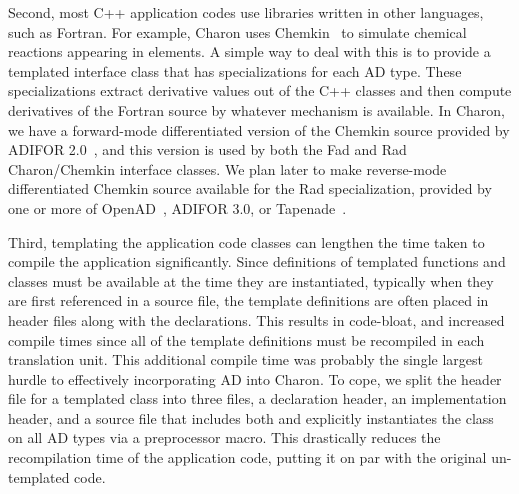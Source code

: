 \documentclass{llncs}
\begin{document}
Second, most C++ application codes use libraries written in
other languages, such as Fortran.  For example, Charon uses
Chemkin~\cite{Chemkin} to simulate chemical reactions appearing
in elements.  A simple way to deal with this
is to provide a templated interface class that has
specializations for each AD type.  These specializations extract
derivative values out of the C++ classes and then compute derivatives
of the Fortran source by whatever mechanism is available.  In Charon,
we have a forward-mode differentiated version of the Chemkin source
provided by  ADIFOR 2.0~\cite{Bischof1996A2A}, and this version is used by both
the Fad and Rad Charon/Chemkin interface classes.  We
plan later to make reverse-mode differentiated Chemkin source available for
the Rad specialization, provided by one or more of OpenAD~\cite{Utke2004OAI},
ADIFOR 3.0, or Tapenade~\cite{tapenade}.

Third, templating the application code classes can lengthen
the time taken to compile the application significantly.
Since definitions of templated functions and classes
must be available at the time they are instantiated, typically when
they are first referenced in a source file, the template
definitions are often placed in header files along with the
declarations.  This results in code-bloat, and increased compile times
since all of the template definitions must be recompiled in each
translation unit.  This additional compile time
was probably the single largest hurdle to
effectively incorporating AD into Charon.  To cope, we
split the header file for a templated class into three files, a
declaration header, an implementation header, and a source file
that includes both and explicitly instantiates the class on all AD
types via a preprocessor macro.  This drastically reduces the
recompilation time of the application code, putting it on par with
the original un-templated code.
\end{document}
